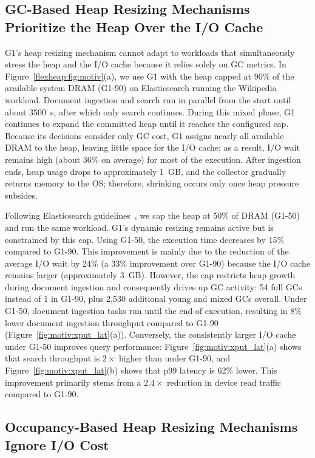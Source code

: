 \subsection{GC-Based Heap Resizing Mechanisms Prioritize the Heap Over the I/O Cache}
\label{sec:gc_driven}

G1’s heap resizing mechanism cannot adapt to workloads that simultaneously stress the heap and the I/O cache because it relies solely on GC metrics.
In Figure~\ref{flexheap:fig:motiv}(a), we use G1 with the heap capped at 90\% of the available system DRAM (G1-90) on Elasticsearch running the Wikipedia workload.
Document ingestion and search run in parallel from the start until about \SI{3500}{s}, after which only search continues.
During this mixed phase, G1 continues to expand the committed heap until it reaches the configured cap.
Because its decisions consider only GC cost, G1 assigns nearly all available DRAM to the heap, leaving little space for the I/O cache; as a result, I/O wait remains high (about 36\% on average) for most of the execution.
After ingestion ends, heap usage drops to approximately \SI{1}{GB}, and the collector gradually returns memory to the OS; therefore, shrinking occurs only once heap pressure subsides.

Following Elasticsearch guidelines~\cite{elasticsearch:guidelines}, we cap the heap at 50\% of DRAM (G1-50) and run the same workload.
G1’s dynamic resizing remains active but is constrained by this cap.
Using G1-50, the execution time decreases by 15\% compared to G1-90.
This improvement is mainly due to the reduction of the average I/O wait by 24\% (a 33\% improvement over G1-90) because the I/O cache remains larger (approximately \SI{3}{GB}).
However, the cap restricts heap growth during document ingestion and consequently drives up GC activity: 54 full GCs instead of 1 in G1-90, plus 2{,}530 additional young and mixed GCs overall.
Under G1-50, document ingestion tasks run until the end of execution, resulting in 8\% lower document ingestion throughput compared to G1-90 (Figure~\ref{fig:motiv:xput_lat}(a)).
Conversely, the consistently larger I/O cache under G1-50 improves query performance: Figure~\ref{fig:motiv:xput_lat}(a) shows that search throughput is $2\times$ higher than under G1-90, and Figure~\ref{fig:motiv:xput_lat}(b) shows that p99 latency is 62\% lower.
This improvement primarily stems from a $2.4\times$ reduction in device read traffic compared to G1-90.

\subsection{Occupancy-Based Heap Resizing Mechanisms Ignore I/O Cost}
\label{sec:occupancy_driven}

